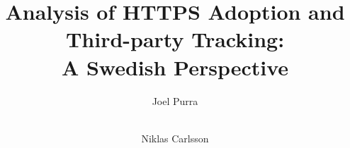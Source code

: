 \documentclass[letterpaper]{sig-alternate-10pt}
\begin{document}
\title{Analysis of HTTPS Adoption and Third-party Tracking: \\A Swedish Perspective}


\author{
\alignauthor Joel Purra\\
       \\
\and
\alignauthor Niklas Carlsson\\
       \\
}
\end{document}
